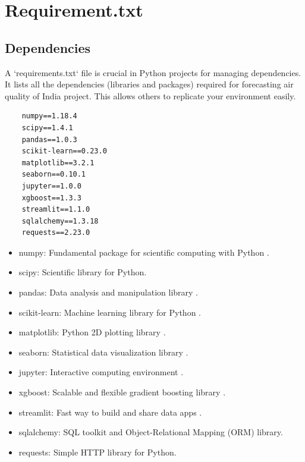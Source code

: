 %
%
%

\chapter{Requirement.txt}
\section{Dependencies}
A `requirements.txt` file is crucial in Python projects for managing dependencies. It lists all the dependencies (libraries and packages) required for forecasting air quality of India project. This allows others to replicate your environment easily.
\begin{verbatim}
	numpy==1.18.4
	scipy==1.4.1
	pandas==1.0.3
	scikit-learn==0.23.0
	matplotlib==3.2.1
	seaborn==0.10.1
	jupyter==1.0.0
	xgboost==1.3.3
	streamlit==1.1.0
	sqlalchemy==1.3.18
	requests==2.23.0
\end{verbatim}

\begin{itemize}
	\item numpy: Fundamental package for scientific computing with Python \cite{NumPy:2024}.
	\item scipy: Scientific library for Python.
	\item pandas: Data analysis and manipulation library \cite{Pandas:2024}.
	\item scikit-learn: Machine learning library for Python \cite{Scikit-Learn:2024}.
	\item matplotlib: Python 2D plotting library \cite{Matplotlib:2024}.
	\item seaborn: Statistical data visualization library \cite{Seaborn:2024}.
	\item jupyter: Interactive computing environment \cite{Jupyter:2024}.
	\item xgboost: Scalable and flexible gradient boosting library \cite{Xgboost:2024}.
	\item streamlit: Fast way to build and share data apps \cite{Streamlit:2024}.
	\item sqlalchemy: SQL toolkit and Object-Relational Mapping (ORM) library.
	\item requests: Simple HTTP library for Python.
\end{itemize}

